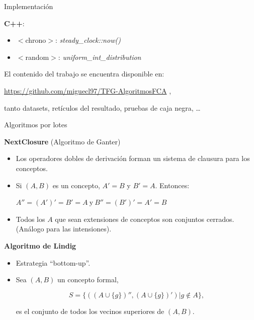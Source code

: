 \documentclass{beamer}
\begin{document}
  \begin{frame}{Implementación}
 
    \begin{block}{\textbf{C++}:}
    \begin{itemize}
        \item $<$chrono$>$: \textit{steady\_clock::now()}
        \item $<$random$>$: \textit{uniform\_int\_distribution}
    \end{itemize}
    \end{block}
    \vspace{4mm}
    El contenido del trabajo se encuentra disponible en:
    \begin{center}
    {\color{Maroon} \url{https://github.com/miguecl97/TFG-AlgoritmosFCA}} , 
    \end{center}
    tanto datasets, retículos del resultado, pruebas de caja negra, \dots
  \end{frame}
\iffalse
\begin{frame}{Algoritmos por lotes}

  \begin{block}{\textbf{NextClosure} (Algoritmo de Ganter)}
  \begin{itemize}
    \justifying

    \item Los operadores dobles de derivación forman un sistema de clausura para los conceptos.
  
    \item Si $(A,B)$ es un concepto, $A'=B$ y $B'=A$. Entonces:\linebreak
    \begin{small}
    $A''=(A')'=B'=A \ \text{y} \ B''=(B')'=A'=B$
    \end{small}
    \item Todos los $A$ que sean extensiones de conceptos son conjuntos cerrados. (Análogo para las intensiones).
    \end{itemize}
   \end{block}
   \pause
  \begin{block}{\textbf{Algoritmo de Lindig}}
  \begin{itemize}

   \justifying
   \item Estrategia ``bottom-up''.
   
   \item Sea $(A,B)$ un concepto formal, 
   \begin{small}
   $$S=\{((A \cup \{g\})'',(A\cup \{g\})') | g \notin A\},$$ 
   \end{small}
   es el conjunto de todos los vecinos superiores de $(A,B)$.
   
   \end{itemize}
  \end{block}
  
  \end{frame}
  
\end{document}
